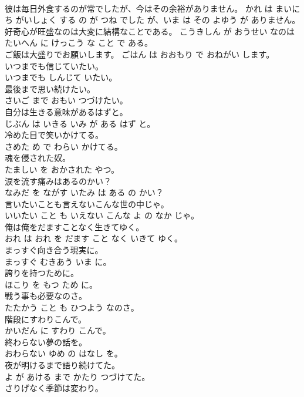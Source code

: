 \documentclass[8pt]{extreport}
\begin{document}
\begin{CJK}{UTF8}{min}
\\	彼は毎日外食するのが常でしたが、今はその余裕がありません。	かれ は まいにち がいしょく する の が つね でした が、いま は その よゆう が ありません。	
\\	好奇心が旺盛なのは大変に結構なことである。	こうきしん が おうせい なのは たいへん に けっこう な こと で ある。	
\\	ご飯は大盛りでお願いします。	ごはん は おおもり で おねがい します。	
\\	いつまでも信じていたい。	
\\	いつまでも しんじて いたい。	
\\	最後まで思い続けたい。	
\\	さいご まで おもい つづけたい。	
\\	自分は生きる意味があるはずと。	
\\	じぶん は いきる いみ が ある はず と。	
\\	冷めた目で笑いかけてる。	
\\	さめた め で わらい かけてる。	
\\	魂を侵された奴。	
\\	たましい を おかされた やつ。	
\\	涙を流す痛みはあるのかい？	
\\	なみだ を ながす いたみ は ある の かい？	
\\	言いたいことも言えないこんな世の中じゃ。	
\\	いいたい こと も いえない こんな よ の なか じゃ。	
\\	俺は俺をだますことなく生きてゆく。	
\\	おれ は おれ を だます こと なく いきて ゆく。	
\\	まっすぐ向き合う現実に。	
\\	まっすぐ むきあう いま に。	
\\	誇りを持つために。	
\\	ほこり を もつ ため に。	
\\	戦う事も必要なのさ。	
\\	たたかう こと も ひつよう なのさ。	
\\	階段にすわりこんで。	
\\	かいだん に すわり こんで。	
\\	終わらない夢の話を。	
\\	おわらない ゆめ の はなし を。	
\\	夜が明けるまで語り続けてた。	
\\	よ が あける まで かたり つづけてた。	
\\	さりげなく季節は変わり。	

\end{CJK}
\end{document}
